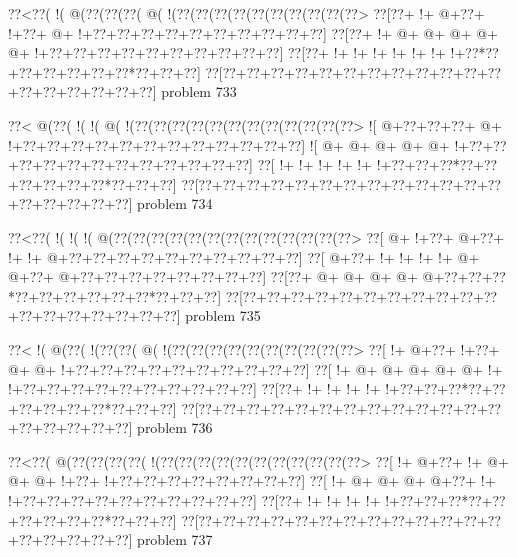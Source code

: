 \vbox{\vbox{\goo
\0??<\0??(\- !(\- @(\0??(\0??(\0??(\- @(\- !(\0??(\0??(\0??(\0??(\0??(\0??(\0??(\0??(\0??(\0??>
\0??[\0??+\- !+\- @+\0??+\- !+\0??+\- @+\- !+\0??+\0??+\0??+\0??+\0??+\0??+\0??+\0??+\0??+\0??]
\0??[\0??+\- !+\- @+\- @+\- @+\- @+\- @+\- !+\0??+\0??+\0??+\0??+\0??+\0??+\0??+\0??+\0??+\0??]
\0??[\0??+\- !+\- !+\- !+\- !+\- !+\- !+\- !+\0??*\0??+\0??+\0??+\0??+\0??+\0??*\0??+\0??+\0??]
\0??[\0??+\0??+\0??+\0??+\0??+\0??+\0??+\0??+\0??+\0??+\0??+\0??+\0??+\0??+\0??+\0??+\0??+\0??]
}
\hfil problem 733\hfil\break
}



\vbox{\vbox{\goo
\0??<\- @(\0??(\- !(\- !(\- @(\- !(\0??(\0??(\0??(\0??(\0??(\0??(\0??(\0??(\0??(\0??(\0??(\0??>
\- ![\- @+\0??+\0??+\0??+\- @+\- !+\0??+\0??+\0??+\0??+\0??+\0??+\0??+\0??+\0??+\0??+\0??+\0??]
\- ![\- @+\- @+\- @+\- @+\- @+\- !+\0??+\0??+\0??+\0??+\0??+\0??+\0??+\0??+\0??+\0??+\0??+\0??]
\0??[\- !+\- !+\- !+\- !+\- !+\- !+\0??+\0??+\0??*\0??+\0??+\0??+\0??+\0??+\0??*\0??+\0??+\0??]
\0??[\0??+\0??+\0??+\0??+\0??+\0??+\0??+\0??+\0??+\0??+\0??+\0??+\0??+\0??+\0??+\0??+\0??+\0??]
}
\hfil problem 734\hfil\break
}



\vbox{\vbox{\goo
\0??<\0??(\- !(\- !(\- !(\- @(\0??(\0??(\0??(\0??(\0??(\0??(\0??(\0??(\0??(\0??(\0??(\0??(\0??>
\0??[\- @+\- !+\0??+\- @+\0??+\- !+\- !+\- @+\0??+\0??+\0??+\0??+\0??+\0??+\0??+\0??+\0??+\0??]
\0??[\- @+\0??+\- !+\- !+\- !+\- !+\- @+\- @+\0??+\- @+\0??+\0??+\0??+\0??+\0??+\0??+\0??+\0??]
\0??[\0??+\- @+\- @+\- @+\- @+\- @+\0??+\0??+\0??*\0??+\0??+\0??+\0??+\0??+\0??*\0??+\0??+\0??]
\0??[\0??+\0??+\0??+\0??+\0??+\0??+\0??+\0??+\0??+\0??+\0??+\0??+\0??+\0??+\0??+\0??+\0??+\0??]
}
\hfil problem 735\hfil\break
}



\vbox{\vbox{\goo
\0??<\- !(\- @(\0??(\- !(\0??(\0??(\- @(\- !(\0??(\0??(\0??(\0??(\0??(\0??(\0??(\0??(\0??(\0??>
\0??[\- !+\- @+\0??+\- !+\0??+\- @+\- @+\- !+\0??+\0??+\0??+\0??+\0??+\0??+\0??+\0??+\0??+\0??]
\0??[\- !+\- @+\- @+\- @+\- @+\- @+\- !+\- !+\0??+\0??+\0??+\0??+\0??+\0??+\0??+\0??+\0??+\0??]
\0??[\0??+\- !+\- !+\- !+\- !+\- !+\0??+\0??+\0??*\0??+\0??+\0??+\0??+\0??+\0??*\0??+\0??+\0??]
\0??[\0??+\0??+\0??+\0??+\0??+\0??+\0??+\0??+\0??+\0??+\0??+\0??+\0??+\0??+\0??+\0??+\0??+\0??]
}
\hfil problem 736\hfil\break
}



\vbox{\vbox{\goo
\0??<\0??(\- @(\0??(\0??(\0??(\0??(\- !(\0??(\0??(\0??(\0??(\0??(\0??(\0??(\0??(\0??(\0??(\0??>
\0??[\- !+\- @+\0??+\- !+\- @+\- @+\- @+\- !+\0??+\- !+\0??+\0??+\0??+\0??+\0??+\0??+\0??+\0??]
\0??[\- !+\- @+\- @+\- @+\- @+\0??+\- !+\- !+\0??+\0??+\0??+\0??+\0??+\0??+\0??+\0??+\0??+\0??]
\0??[\0??+\- !+\- !+\- !+\- !+\- !+\0??+\0??+\0??*\0??+\0??+\0??+\0??+\0??+\0??*\0??+\0??+\0??]
\0??[\0??+\0??+\0??+\0??+\0??+\0??+\0??+\0??+\0??+\0??+\0??+\0??+\0??+\0??+\0??+\0??+\0??+\0??]
}
\hfil problem 737\hfil\break
}



